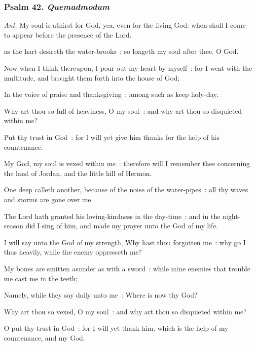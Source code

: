 \subsubsection{Psalm 42. \textit{Quemadmodum}}\par\noindent
\textit{Ant.} My soul is athirst for God, {\dag} yea, even for the living God: when shall I come to appear before the presence of the Lord.\par
{} as the hart desireth the water-brooks~: so longeth my soul after thee, O God.\par
{}
Now when I think thereupon, I pour out my heart by myself~: for I went with the multitude, and brought them forth into the house of God;\par
{}In the voice of praise and thanksgiving~: among such as keep holy-day.\par
{}Why art thou so full of heaviness, O my soul~: and why art thou so disquieted within me?\par
{}Put thy trust in God~: for I will yet give him thanks for the help of his countenance.\par
{}My God, my soul is vexed within me~: therefore will I remember thee concerning the land of Jordan, and the little hill of Hermon.\par
{}One deep calleth another, because of the noise of the water-pipes~: all thy waves and storms are gone over me.\par
{}The Lord hath granted his loving-kindness in the day-time~: and in the night-season did I sing of him, and made my prayer unto the God of my life.\par
{}I will say unto the God of my strength, Why hast thou forgotten me~: why go I thus heavily, while the enemy oppresseth me?\par
{}My bones are smitten asunder as with a sword~: while mine enemies that trouble me cast me in the teeth;\par
{}Namely, while they say daily unto me~: Where is now thy God?\par
{}Why art thou so vexed, O my soul~: and why art thou so disquieted within me?\par
{}O put thy trust in God~: for I will yet thank him, which is the help of my countenance, and my God.\par
